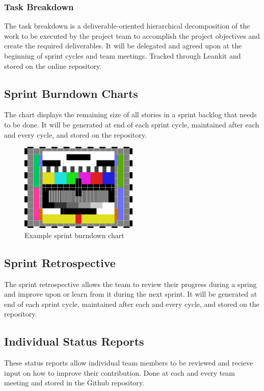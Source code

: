 \subsubsection{Task Breakdown}
The task breakdown is a deliverable-oriented hierarchical decomposition of the work to be executed by the project team to accomplish the project objectives and create the required deliverables. It will be delegated and agreed upon at the beginning of sprint cycles and team meetings. Tracked through Leankit and stored on the online repository.

\subsection{Sprint Burndown Charts}
The chart displays the remaining size of all stories in a sprint backlog that needs to be done. It will be generated at end of each sprint cycle, maintained after each and every cycle, and stored on the repository.

\begin{figure}[h!]
    \centering
    \includegraphics[width=0.5\textwidth]{images/test_image}
    \caption{Example sprint burndown chart}
\end{figure}

\subsection{Sprint Retrospective}
The sprint retrospective allows the team to review their progress during a spring and improve upon or learn from it during the next sprint. It will be generated at end of each sprint cycle, maintained after each and every cycle, and stored on the repository.

\subsection{Individual Status Reports}
These status reports allow individual team members to be reviewed and recieve input on how to improve their contribution. Done at each and every team meeting and stored in the Github repository.

